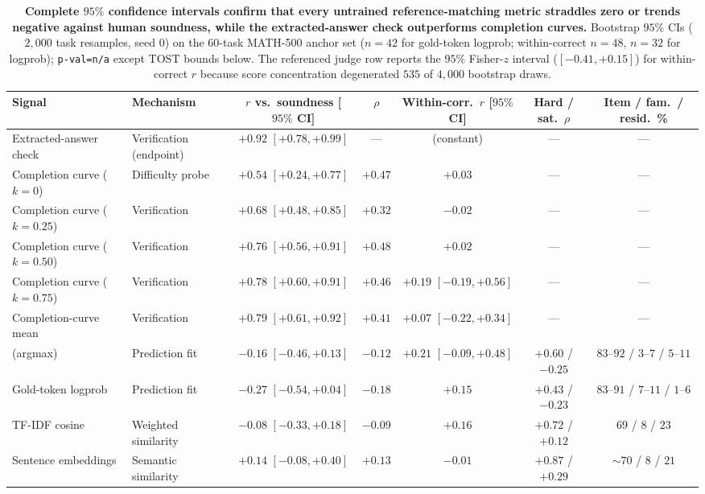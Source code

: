 \begin{table}[t]
\centering
\caption{\textbf{Complete $95\%$ confidence intervals confirm that every untrained reference-matching metric straddles zero or trends negative against human soundness, while the extracted-answer check outperforms completion curves.} Bootstrap $95\%$ CIs ($2{,}000$ task resamples, seed $0$) on the $60$-task \textsc{MATH-500} anchor set ($n{=}42$ for gold-token logprob; within-correct $n{=}48$, $n{=}32$ for logprob); \texttt{p-val=n/a} except TOST bounds below.
The referenced judge row reports the $95\%$ Fisher-$z$ interval ($[-0.41, +0.15]$) for within-correct $r$ because score concentration degenerated $535$ of $4{,}000$ bootstrap draws.}
\label{tab:citwin}
\scriptsize
\setlength{\tabcolsep}{2.4pt}
\begin{tabular}{@{}llccccc@{}}
\toprule
Signal & Mechanism & $r$ vs.\ soundness [$95\%$ CI] & $\rho$ & Within-corr.\ $r$ [$95\%$ CI] & Hard / sat.\ $\rho$ & Item / fam.\ / resid.\ \% \\
\midrule
Extracted-answer check & Verification (endpoint) & $\mathbf{+0.92}$ $[+0.78, +0.99]$ & --- & (constant) & --- & --- \\
\midrule
Completion curve ($k{=}0$) & Difficulty probe & $+0.54$ $[+0.24, +0.77]$ & $+0.47$ & $+0.03$ & --- & --- \\
Completion curve ($k{=}0.25$) & Verification & $+0.68$ $[+0.48, +0.85]$ & $+0.32$ & $-0.02$ & --- & --- \\
Completion curve ($k{=}0.50$) & Verification & $+0.76$ $[+0.56, +0.91]$ & $+0.48$ & $+0.02$ & --- & --- \\
Completion curve ($k{=}0.75$) & Verification & $+0.78$ $[+0.60, +0.91]$ & $+0.46$ & $+0.19$ $[-0.19, +0.56]$ & --- & --- \\
Completion-curve mean & Verification & $+0.79$ $[+0.61, +0.92]$ & $+0.41$ & $+0.07$ $[-0.22, +0.34]$ & --- & --- \\
\midrule
\tfa{} (argmax) & Prediction fit & $-0.16$ $[-0.46, +0.13]$ & $-0.12$ & $+0.21$ $[-0.09, +0.48]$ & $+0.60$ / $-0.25$ & $83$--$92$ / $3$--$7$ / $5$--$11$ \\
Gold-token logprob & Prediction fit & $-0.27$ $[-0.54, +0.04]$ & $-0.18$ & $+0.15$ & $+0.43$ / $-0.23$ & $83$--$91$ / $7$--$11$ / $1$--$6$ \\
TF-IDF cosine & Weighted similarity & $-0.08$ $[-0.33, +0.18]$ & $-0.09$ & $+0.16$ & $+0.72$ / $+0.12$ & $69$ / $8$ / $23$ \\
Sentence embeddings & Semantic similarity & $+0.14$ $[-0.08, +0.40]$ & $+0.13$ & $-0.01$ & $+0.87$ / $+0.29$ & $\sim 70$ / $8$ / $21$ \\

\end{tabular}
\end{table}
